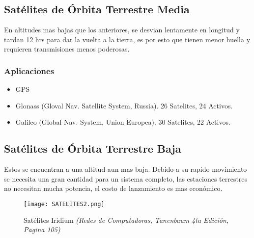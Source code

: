 \subsection*{Satélites de Órbita Terrestre Media}
En altitudes mas bajas que los anteriores, se desvian lentamente en longitud y tardan 12 hrs para dar la vuelta a la tierra, es por esto que tienen menor huella y requieren transmisiones menos poderosas.
\subsubsection*{Aplicaciones}
\begin{itemize}
\item GPS
\item Glonass (Gloval Nav. Satellite System, Russia). 26 Satelites, 24 Activos.
\item Galileo (Global Nav. System, Union Europea). 30 Satelites, 22 Activos.
\end{itemize}
\subsection*{Satélites de Órbita Terrestre Baja}
Estos se encuentran a una altitud aun mas baja. Debido a su rapido movimiento se necesita una gran cantidad para un sistema completo, las estaciones terrestres no necesitan mucha potencia, el costo de lanzamiento es mas económico.

\begin{figure}[H]
\centering
\texttt{[image: SATELITES2.png]}
\caption{Satélites Iridium \textit{(Redes de Computadoras, Tanenbaum 4ta Edición, Pagina 105)}}
\end{figure}

